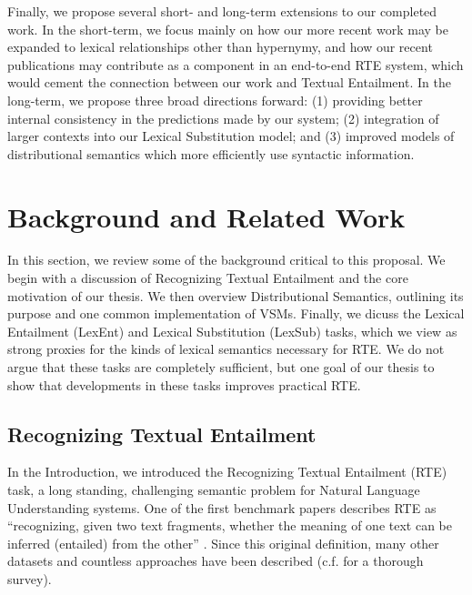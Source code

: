 \documentclass[12pt]{article}
\begin{document}
Finally, we propose several short- and long-term extensions to our completed
work. In the short-term, we focus mainly on how our more recent work may be
expanded to lexical relationships other than hypernymy, and how our recent
publications may  contribute as a component in an end-to-end RTE system, which
would cement the connection between our work and Textual Entailment. In the
long-term, we propose three broad directions forward: (1) providing better
internal consistency in the predictions made by our system; (2) integration
of larger contexts into our Lexical Substitution model; and (3) improved
models of distributional semantics which more efficiently use syntactic
information.


\section{Background and Related Work}
\label{sec:background}

In this section, we review some of the background critical to this proposal.
We begin with a discussion of Recognizing Textual Entailment and the core
motivation of our thesis.  We then overview Distributional Semantics, outlining
its purpose and one common implementation of VSMs. Finally, we dicuss the
Lexical Entailment (LexEnt) and Lexical Substitution (LexSub) tasks, which we
view as strong proxies for the kinds of lexical semantics necessary for RTE. We
do not argue that these tasks are completely sufficient, but one goal of our
thesis to show that developments in these tasks improves practical RTE.

\subsection{Recognizing Textual Entailment}
\label{sec:textent}

In the Introduction, we introduced the Recognizing Textual Entailment (RTE)
task, a long standing, challenging semantic problem for Natural Language
Understanding systems. One of the first benchmark papers
describes RTE as ``recognizing, given two text fragments, whether the
meaning of one text can be inferred (entailed) from the other''
\cite{dagan:2006:mlc}. Since this original definition, many other datasets
\cite{giampiccolo:2007:pascal,bentivogli:2009:tac,marelli:2014:semeval} and
countless approaches have been described (c.f. 
for a thorough survey).
\end{document}

